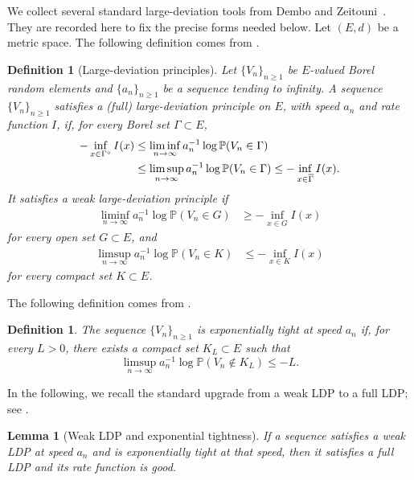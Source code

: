 \documentclass[a4paper, 11pt]{article}
\newcommand{\1}{\mathbf 1}
\theoremstyle{plain}
\newtheorem{lemma}[theorem]{Lemma}
\newtheorem{definition}[theorem]{Definition}
\begin{document}
We collect several standard large-deviation tools from Dembo and
Zeitouni~\cite{DemboZeitouni2010}. They are recorded here to fix the precise
forms needed below. Let \((E,d)\) be a metric space. The following definition comes from \cite[p. 5, p. 7]{DemboZeitouni2010}.
\begin{definition}[Large-deviation principles]
\label{def:LDP}
Let \(\{V_n\}_{n\geq1}\) be \(E\)-valued Borel
random elements and $\{a_n\}_{n\geq1}$ be a sequence tending to infinity. A sequence
\(\{V_n\}_{n\geq1}\) satisfies a \emph{(full) large-deviation principle}
on \(E\), with speed \(a_n\) and rate function \(I\), if, for every
Borel set \(\Gamma\subset E\),
\begin{align}
  -\inf_{x\in\Gamma^\circ}I(x)
  &\leq
  \liminf_{n\to\infty}a_n^{-1}
  \log\mathbb{P}(V_n\in\Gamma)
  \notag\\
  &\leq
  \limsup_{n\to\infty}a_n^{-1}
  \log\mathbb{P}(V_n\in\Gamma)
  \leq
  -\inf_{x\in\overline\Gamma}I(x).\nonumber
\end{align}
It satisfies a \emph{weak large-deviation principle} if
\begin{align}
  \liminf_{n\to\infty}a_n^{-1}\log\mathbb{P}(V_n\in G)
  &\geq-\inf_{x\in G}I(x)
  \label{eq:weak-LDP-lower}
\end{align}
for every open set \(G\subset E\), and
\begin{align}
  \limsup_{n\to\infty}a_n^{-1}\log\mathbb{P}(V_n\in K)
  &\leq-\inf_{x\in K}I(x)
  \label{eq:weak-LDP-upper}
\end{align}
for every compact set \(K\subset E\).
\end{definition}
The following definition comes from \cite[p. 8]{DemboZeitouni2010}.
\begin{definition}
The sequence \(\{V_n\}_{n\geq1}\) is \emph{exponentially tight} at
speed \(a_n\) if, for every \(L>0\), there exists a compact set
\(K_L\subset E\) such that
\begin{equation}\label{eq:exponential-tightness}
  \limsup_{n\to\infty}a_n^{-1}
  \log\mathbb{P}(V_n\notin K_L)
  \leq-L.
\end{equation}
\end{definition}

In the following, we recall the standard upgrade from a weak LDP to a full LDP;
see \cite[Lemma~1.2.18]{DemboZeitouni2010}.

\begin{lemma}[Weak LDP and exponential tightness]
\label{lem:weak-to-full}
If a sequence satisfies a weak LDP at speed \(a_n\) and is exponentially
tight at that speed, then it satisfies a full LDP and its rate function is
good.
\end{lemma}
\end{document}
